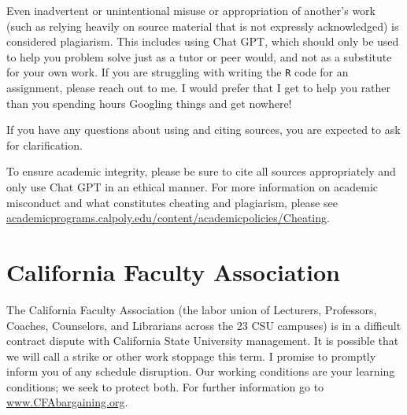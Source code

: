 \documentclass[
  11pt,
  letterpaper,
  DIV=11,
  numbers=noendperiod]{scrartcl}
\begin{document}
Even inadvertent or unintentional misuse or appropriation of another's
work (such as relying heavily on source material that is not expressly
acknowledged) is considered plagiarism. This includes using Chat GPT,
which should only be used to help you problem solve just as a tutor or
peer would, and not as a substitute for your own work. If you are
struggling with writing the \texttt{R} code for an assignment, please
reach out to me. I would prefer that I get to help you rather than you
spending hours Googling things and get nowhere!

If you have any questions about using and citing sources, you are
expected to ask for clarification.

To ensure academic integrity, please be sure to cite all sources
appropriately and only use Chat GPT in an ethical manner. For more
information on academic misconduct and what constitutes cheating and
plagiarism, please see
\href{https://academicprograms.calpoly.edu/content/academicpolicies/Cheating}{academicprograms.calpoly.edu/content/academicpolicies/Cheating}.

\hypertarget{california-faculty-association}{%
\section{California Faculty
Association}\label{california-faculty-association}}

The California Faculty Association (the labor union of Lecturers,
Professors, Coaches, Counselors, and Librarians across the 23 CSU
campuses) is in a difficult contract dispute with California State
University management. It is possible that we will call a strike or
other work stoppage this term. I promise to promptly inform you of any
schedule disruption. Our working conditions are your learning
conditions; we seek to protect both. For further information go to
\href{https://www.cfabargaining.org/}{www.CFAbargaining.org}.
\end{document}
